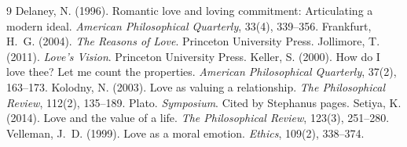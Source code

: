 \documentclass{situationist-preprint}
\begin{document}
\begin{thebibliography}{9}\small
{} Delaney, N. (1996). Romantic love and loving commitment: Articulating a modern ideal. \emph{American Philosophical Quarterly}, 33(4), 339--356.
 Frankfurt, H.~G. (2004). \emph{The Reasons of Love}. Princeton University Press.
 Jollimore, T. (2011). \emph{Love's Vision}. Princeton University Press.
 Keller, S. (2000). How do I love thee? Let me count the properties. \emph{American Philosophical Quarterly}, 37(2), 163--173.
 Kolodny, N. (2003). Love as valuing a relationship. \emph{The Philosophical Review}, 112(2), 135--189.
 Plato. \emph{Symposium}. Cited by Stephanus pages.
 Setiya, K. (2014). Love and the value of a life. \emph{The Philosophical Review}, 123(3), 251--280.
 Velleman, J.~D. (1999). Love as a moral emotion. \emph{Ethics}, 109(2), 338--374.
\end{thebibliography}
\end{document}
